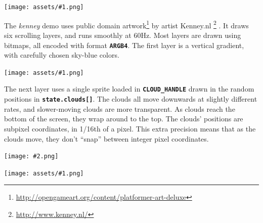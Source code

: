 \documentclass[10pt]{book}
\newcommand{\png}[1]{
\begin{center}
\texttt{[image: assets/\#1.png]}
\end{center}
}
\newcommand{\szpng}[2]{
\begin{center}
\texttt{[image: \#2.png]}
\end{center}
}
\newcommand{\mach}[1]{\texttt{\textbf{#1}}}
\begin{document}
\begin{CJK}{UTF8}{gkai}
\png{kenney}

The \textit{kenney} demo uses public domain artwork\footnote{\url{http://opengameart.org/content/platformer-art-deluxe}}
by artist Kenney.nl
\footnote{\url{http://www.kenney.nl/}}
.
It draws six scrolling layers,
and runs smoothly at 60Hz.
Most layers are drawn using bitmaps, all encoded with format \mach{ARGB4}.
The first layer is a vertical gradient, with carefully chosen sky-blue colors.

\png{kenney_0}

\noindent
The next layer uses a single sprite loaded in \mach{CLOUD\_HANDLE}
drawn in the random positions in \mach{state.clouds[]}.
The clouds all move downwards at slightly different rates,
and slower-moving clouds are more transparent.
As clouds reach the bottom of the screen, they wrap around to the top.
The clouds' positions are subpixel coordinates, in 1/16th of a pixel.
This extra precision means that as the clouds move, they don't ``snap''
between integer pixel coordinates.

\szpng{0.2}{previews/kenney-CLOUD-00}
\png{kenney_1}



\end{CJK}
\end{document}
